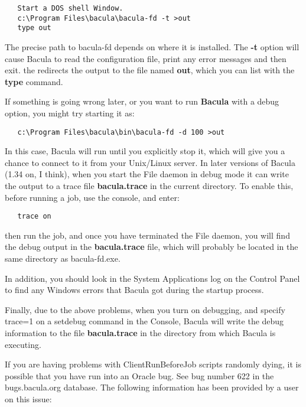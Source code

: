 \footnotesize
\begin{verbatim}
   Start a DOS shell Window.
   c:\Program Files\bacula\bacula-fd -t >out
   type out
\end{verbatim}
\normalsize

The precise path to bacula-fd depends on where it is installed.
The {\bf -t} option will cause Bacula to read the configuration file, print
any error messages and then exit. the {\bf \gt{}} redirects the output to the
file named {\bf out}, which you can list with the {\bf type} command. 

If something is going wrong later, or you want to run {\bf Bacula} with a
debug option, you might try starting it as: 

\footnotesize
\begin{verbatim}
   c:\Program Files\bacula\bin\bacula-fd -d 100 >out
\end{verbatim}
\normalsize

In this case, Bacula will run until you explicitly stop it, which will give
you a chance to connect to it from your Unix/Linux server. In later versions
of Bacula (1.34 on, I think), when you start the File daemon in debug mode it
can write the output to a trace file {\bf bacula.trace} in the current
directory. To enable this, before running a job, use the console, and enter: 

\footnotesize
\begin{verbatim}
   trace on
\end{verbatim}
\normalsize

then run the job, and once you have terminated the File daemon, you will find
the debug output in the {\bf bacula.trace} file, which will probably be 
located in the same directory as bacula-fd.exe.

In addition, you should look in the System Applications log on the Control
Panel to find any Windows errors that Bacula got during the startup process. 

Finally, due to the above problems, when you turn on debugging, and specify
trace=1 on a setdebug command in the Console, Bacula will write the debug
information to the file {\bf bacula.trace} in the directory from which Bacula
is executing. 

If you are having problems with ClientRunBeforeJob scripts randomly dying, 
it is possible that you have run into an Oracle bug.  See bug number 622 in
the bugs.bacula.org database.  The following information has been
provided by a user on this issue:

